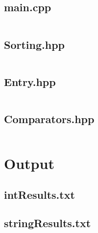 \documentclass[titlepage]{article}
\begin{document}
\subsection{main.cpp}
\inputminted{c++}{../../src/main.cpp}
\subsection{Sorting.hpp}
\inputminted{c++}{../../include/Sorting.hpp}
\subsection{Entry.hpp}
\inputminted{c++}{../../include/Entry.hpp}
\subsection{Comparators.hpp}
\inputminted{c++}{../../include/Comparators.hpp}

\newpage

\section{Output}
\subsection{intResults.txt}

\hrulefill
\subsection{stringResults.txt}

\end{document}
